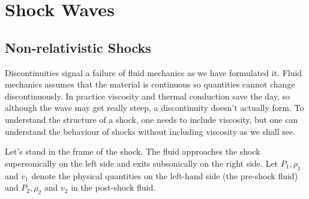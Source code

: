 \chapter{Shock Waves}
\label{cha:shock-waves}\label{sec:shock-waves}

\section{Non-relativistic Shocks}
\label{sec:non-relat-shocks}

Discontinuities signal a failure of fluid mechanics as we have
formulated it.   Fluid mechanics assumes that the material is
continuous so quantities cannot change discontinuously.  In practice
viscosity and thermal conduction save the day, so although the wave
may get really steep, a discontinuity doesn't actually form.  To
understand the structure of a shock, one needs to include viscosity,
but one can understand the behaviour of shocks without including
viscosity as we shall see.

Let's stand in the frame of the shock.  The fluid approaches the shock
supersonically on the left side and exits subsonically on the right
side.   Let $P_1, \rho_1$ and $v_1$ denote the physical quantities on
the left-hand side (the pre-shock fluid) and $P_2, \rho_2$ and $v_2$
in the post-shock fluid. 

